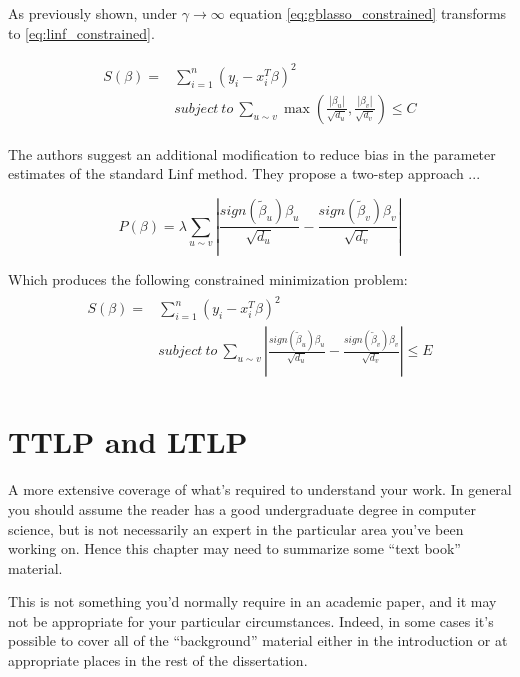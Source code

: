 As previously shown, under $\gamma\rightarrow\infty$ equation \ref{eq:gblasso_constrained} transforms to \ref{eq:linf_constrained}. 

\begin{align} \label{eq:linf_constrained}
\begin{split}
S(\beta) = &\sum_{i=1}^{n} (y_i - x_i^T\beta)^2 \\ 
&subject\ to\ \sum_{u \sim v}\max\left(\frac{|\beta_u|}{\sqrt{d_u}},\frac{|\beta_v|}{\sqrt{d_v}}\right)\leq C
\end{split}
\end{align}

The authors suggest an additional modification to reduce bias in the parameter estimates of the standard Linf method. They propose a two-step approach ...

\begin{equation} \label{eq:alinf_pen}
P(\beta) = \lambda\sum_{u \sim v}\left|\frac{sign(\tilde{\beta}_u)\beta_u}{\sqrt{d_u}}-\frac{sign(\tilde{\beta}_v)\beta_v}{\sqrt{d_v}}\right|
\end{equation}

Which produces the following constrained minimization problem:
\begin{align} \label{eq:alinf_constrained}
\begin{split}
S(\beta) = &\sum_{i=1}^{n} (y_i - x_i^T\beta)^2 \\ 
&subject\ to\ \sum_{u \sim v}\left|\frac{sign(\tilde{\beta}_u)\beta_u}{\sqrt{d_u}}-\frac{sign(\tilde{\beta}_v)\beta_v}{\sqrt{d_v}}\right|\leq E
\end{split}
\end{align}


\section{TTLP and LTLP}


\newpage

A more extensive coverage of what's required to understand your 
work. In general you should assume the reader has a good undergraduate 
degree in computer science, but is not necessarily an expert in 
the particular area you've been working on. Hence this chapter 
may need to summarize some ``text book'' material. 

This is not something you'd normally require in an academic paper, 
and it may not be appropriate for your particular circumstances. 
Indeed, in some cases it's possible to cover all of the ``background'' 
material either in the introduction or at appropriate places in 
the rest of the dissertation. 

